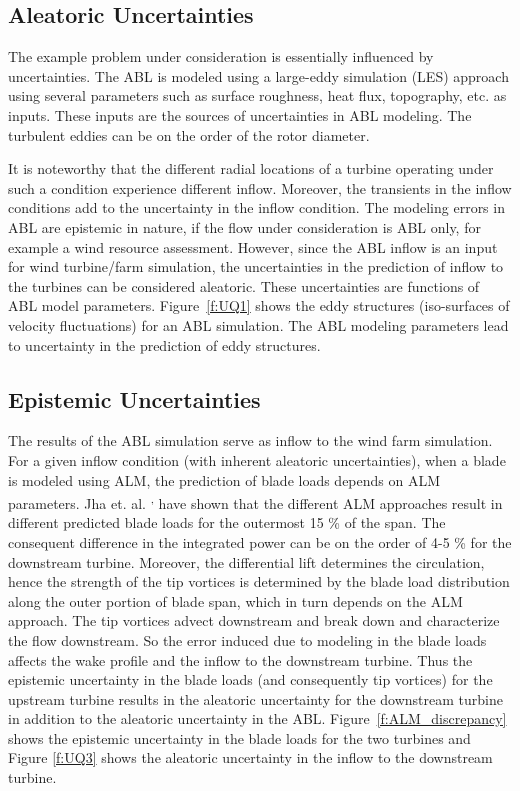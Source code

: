 \documentclass[]{aiaa-tc}%
\begin{document}
\subsection{Aleatoric Uncertainties}

The example problem under consideration is essentially influenced by uncertainties. The ABL is modeled using a large-eddy simulation (LES) approach\cite{churchfield:aiaa2012} using several parameters such as surface roughness, heat flux, topography, etc. as inputs. These inputs are the sources of uncertainties in ABL modeling. The turbulent eddies can be on the order of the rotor diameter. 

It is noteworthy that the different radial locations of a turbine operating under such a condition experience different inflow. Moreover, the transients in the inflow conditions add to the uncertainty in the inflow condition. The modeling errors in ABL are epistemic in nature, if the flow under consideration is ABL only, for example a wind resource assessment. However, since the ABL inflow is an input for wind turbine/farm simulation, the uncertainties in the prediction of inflow to the turbines can be considered aleatoric. These uncertainties are functions of ABL model parameters. Figure~\ref{f:UQ1} shows the eddy structures (iso-surfaces of velocity fluctuations) for an ABL simulation. The ABL modeling parameters lead to uncertainty in the prediction of eddy structures.

\subsection{Epistemic Uncertainties}

The results of the ABL simulation serve as inflow to the wind farm simulation. For a given inflow condition (with inherent aleatoric uncertainties), when a blade is modeled using ALM, the prediction of blade loads depends on ALM parameters. Jha et. al. \cite{jha:aiaa2014}\textsuperscript{, }\cite{jha:jsee2014} have shown that the different ALM approaches result in different predicted blade loads for the outermost 15 \% of the span. The consequent difference in the integrated power can be on the order of 4-5 \% for the downstream turbine. Moreover, the differential lift determines the circulation, hence the strength of the tip vortices is determined by the blade load distribution along the outer portion of blade span, which in turn depends on the ALM approach. The tip vortices advect downstream and break down and characterize the flow downstream. So the error induced due to modeling in the blade loads affects the wake profile and the inflow to the downstream turbine. Thus the epistemic uncertainty in the blade loads (and consequently tip vortices) for the upstream turbine results in the aleatoric uncertainty for the downstream turbine in addition to the aleatoric uncertainty in the ABL. Figure~\ref{f:ALM_discrepancy} shows the epistemic uncertainty in the blade loads for the two turbines and Figure \ref{f:UQ3} shows the aleatoric uncertainty in the inflow to the downstream turbine.
\end{document}
